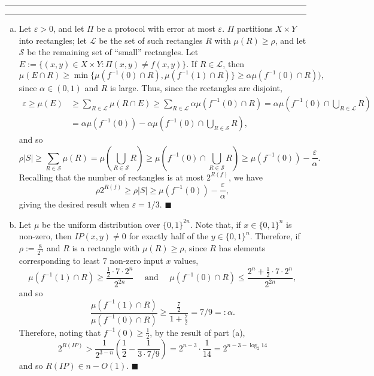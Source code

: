 \documentclass[11pt]{article}
\newcounter{questionCounter}
\newcounter{partCounter}[questionCounter]
\newenvironment{question}[2][\arabic{questionCounter}]{%
    \setcounter{partCounter}{0}%
    \vspace{.25in} \hrule \vspace{0.5em}%
        \noindent{\bf #2}%
    \vspace{0.8em} \hrule \vspace{.10in}%
    \addtocounter{questionCounter}{1}%
}{}
\renewcommand{\qed}{\quad $\blacksquare$}
\newcommand{\inv}{^{-1}} %
\newcommand{\e}{\varepsilon} %
\renewcommand{\L}{\mathcal{L}}
\renewcommand{\S}{\mathcal{S}}
\begin{document}
\begin{question}{Problem 5}
\begin{enumerate}[(a)]
\item Let $\e > 0$, and let $\Pi$ be a protocol with error at most $\e$. $\Pi$
partitions $X \times Y$ into rectangles; let $\L$ be the set of such rectangles
$R$ with $\mu(R) \geq \rho$, and let $\S$ be the remaining set of ``small''
rectangles. Let $E := \{(x,y) \in X \times Y : \Pi(x,y) \neq f(x,y)\}$. If
$R \in \L$, then
\[\mu(E \cap R)
    \geq \min \{\mu(f\inv(0) \cap R), \mu(f\inv(1) \cap R)\}
    \geq \alpha \mu(f\inv(0) \cap R)),
\]
since $\alpha \in (0,1)$ and $R$ is large. Thus, since the rectangles are
disjoint,
\begin{align*}
\e
      \geq \mu(E)
    & \geq \sum_{R \in \L} \mu(R \cap E)
      \geq \sum_{R \in \L} \alpha\mu \left( f\inv(0) \cap R \right)
      = \alpha \mu \left( f\inv(0) \cap \bigcup_{R \in \L} R \right)      \\
    & = \alpha \mu \left( f\inv(0) \right)
      - \alpha \mu \left( f\inv(0) \cap \bigcup_{R \in \S} R \right),
\end{align*}
and so
\[\rho|S|
    \geq \sum_{R \in \S} \mu(R)
    = \mu \left( \bigcup_{R \in \S} R \right)
    \geq \mu \left( f\inv(0) \cap \bigcup_{R \in \S} R \right)
    \geq \mu \left( f\inv(0) \right) - \frac{\e}{\alpha}
.\]
Recalling that the number of rectangles is at most $2^{R(f)}$, we have
\[\rho2^{R(f)}
    \geq \rho|S|
    \geq \mu \left( f\inv(0) \right) - \frac{\e}{\alpha}
,\]
giving the desired result when $\e = 1/3$. \qed

\item Let $\mu$ be the uniform distribution over $\{0,1\}^{2n}$. Note that, if
$x \in \{0,1\}^n$ is non-zero, then $IP(x,y) \neq 0$ for exactly half of the
$y \in \{0,1\}^n$. Therefore, if
$\rho := \frac{8}{2^n}$ and $R$ is a rectangle with
$\mu(R) \geq \rho$, since $R$ has elements corresponding to least $7$ non-zero
input $x$ values,
\[\mu(f\inv(1) \cap R) \geq \frac{\frac12 \cdot 7 \cdot 2^n}{2^{2n}}
    \quad \mbox{ and } \quad
\mu(f\inv(0) \cap R) \leq \frac{2^n + \frac12 \cdot 7 \cdot 2^n}{2^{2n}}
,\]
and so
\[\frac{\mu(f\inv(1) \cap R)}{\mu(f\inv(0) \cap R)}
    \geq \frac{\frac72}{1 + \frac72}
    = 7/9
    =: \alpha
.\]
Therefore, noting that $f\inv(0) \geq \frac12$, by the result of part (a),
\[2^{R(IP)}
    > \frac{1}{2^{3 - n}} \left( \frac12 - \frac{1}{3\cdot7/9} \right)
    = 2^{n - 3} \cdot \frac{1}{14}
    = 2^{n - 3 - \log_2 14}
\]
and so $R(IP) \in n - O(1)$. \qed
\end{enumerate}
\end{question}
\end{document}
